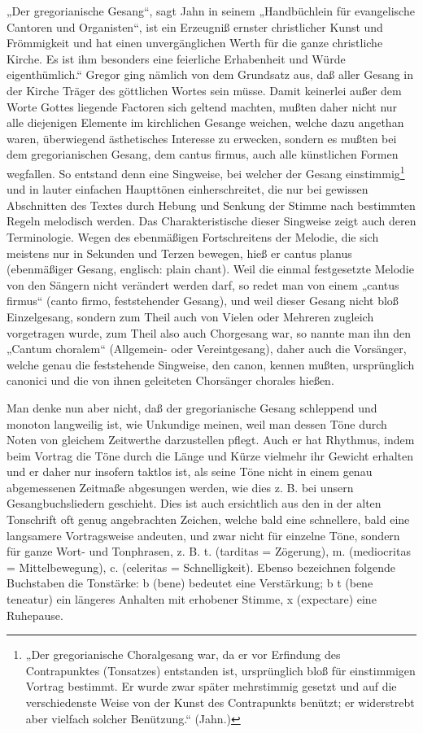„Der gregorianische Gesang“, sagt Jahn in seinem „Handbüchlein für evangelische Cantoren und Organisten“, ist ein Erzeugniß ernster christlicher Kunst und Frömmigkeit und hat einen unvergänglichen Werth für die ganze christliche Kirche. Es ist ihm besonders eine feierliche Erhabenheit und Würde eigenthümlich.“ Gregor ging nämlich von dem Grundsatz aus, daß aller Gesang in der Kirche Träger des göttlichen Wortes sein müsse. Damit keinerlei außer dem Worte Gottes liegende Factoren sich geltend machten, mußten daher nicht nur alle diejenigen Elemente im kirchlichen Gesange weichen, welche dazu angethan waren, überwiegend ästhetisches Interesse zu erwecken, sondern es mußten bei dem gregorianischen Gesang, dem cantus firmus, auch
alle künstlichen Formen wegfallen. So entstand denn eine Singweise, bei welcher der Gesang einstimmig\footnote{„Der gregorianische Choralgesang war, da er vor Erfindung des Contrapunktes (Tonsatzes) entstanden ist, ursprünglich bloß für einstimmigen Vortrag bestimmt. Er wurde zwar später mehrstimmig gesetzt und auf die verschiedenste Weise von der Kunst des Contrapunkts benützt; er widerstrebt aber vielfach solcher Benützung.“ (Jahn.)} und in lauter einfachen Haupttönen einherschreitet, die nur bei gewissen Abschnitten des Textes durch Hebung und Senkung der Stimme nach bestimmten Regeln melodisch werden. Das Charakteristische dieser Singweise zeigt auch deren Terminologie. Wegen des ebenmäßigen Fortschreitens der Melodie, die sich meistens nur in Sekunden und Terzen bewegen, hieß er cantus planus (ebenmäßiger Gesang, englisch: plain chant). Weil die einmal festgesetzte Melodie von den Sängern nicht verändert werden darf, so redet man von einem „cantus firmus“ (canto firmo, feststehender Gesang), und weil dieser Gesang nicht bloß Einzelgesang, sondern zum Theil auch von Vielen oder Mehreren zugleich vorgetragen wurde, zum Theil also auch Chorgesang war, so nannte man ihn den „Cantum choralem“ (Allgemein- oder Vereintgesang), daher auch die Vorsänger, welche genau die feststehende Singweise, den canon, kennen mußten, ursprünglich canonici und die von ihnen geleiteten Chorsänger chorales hießen.

Man denke nun aber nicht, daß der gregorianische Gesang schleppend und monoton langweilig ist, wie Unkundige meinen, weil man dessen Töne durch Noten von gleichem Zeitwerthe darzustellen pflegt. Auch er hat Rhythmus, indem beim Vortrag die Töne durch die Länge und Kürze vielmehr ihr Gewicht erhalten und er daher nur insofern taktlos ist, als seine Töne nicht in einem genau abgemessenen Zeitmaße abgesungen werden, wie dies z. B. bei unsern Gesangbuchsliedern geschieht. Dies ist auch ersichtlich aus den in der alten Tonschrift oft genug angebrachten Zeichen, welche bald eine schnellere, bald eine langsamere Vortragsweise andeuten, und zwar nicht für einzelne Töne, sondern für ganze Wort- und Tonphrasen, z. B. t. (tarditas = Zögerung), m. (mediocritas = Mittelbewegung), c. (celeritas = Schnelligkeit). Ebenso bezeichnen folgende Buchstaben die Tonstärke: b (bene) bedeutet eine Verstärkung; b t (bene teneatur) ein längeres Anhalten mit erhobener Stimme, x (expectare) eine Ruhepause.

